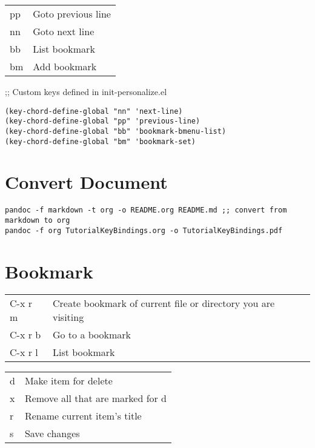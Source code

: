 \documentclass[11pt]{article}
\begin{document}
\begin{center}
\begin{tabular}{ll}
\hline
pp & Goto previous line\\
nn & Goto next line\\
bb & List bookmark\\
bm & Add bookmark\\
\end{tabular}
\end{center}

;; Custom keys defined in init-personalize.el\\
\begin{verbatim}
(key-chord-define-global "nn" 'next-line)
(key-chord-define-global "pp" 'previous-line)
(key-chord-define-global "bb" 'bookmark-bmenu-list)
(key-chord-define-global "bm" 'bookmark-set)
\end{verbatim}

\section{Convert Document}
\label{sec:orgace9259}
\begin{verbatim}
pandoc -f markdown -t org -o README.org README.md ;; convert from markdown to org
pandoc -f org TutorialKeyBindings.org -o TutorialKeyBindings.pdf
\end{verbatim}

\section{Bookmark}
\label{sec:org58b0169}
\begin{center}
\begin{tabular}{ll}
\hline
C-x r m & Create bookmark of current file or directory you are visiting\\
C-x r b & Go to a bookmark\\
C-x r l & List bookmark\\
\end{tabular}
\end{center}

\begin{center}
\begin{tabular}{ll}
\hline
d & Make item for delete\\
x & Remove all that are marked for d\\
r & Rename current item's title\\
s & Save changes\\
\end{tabular}
\end{center}
\end{document}
